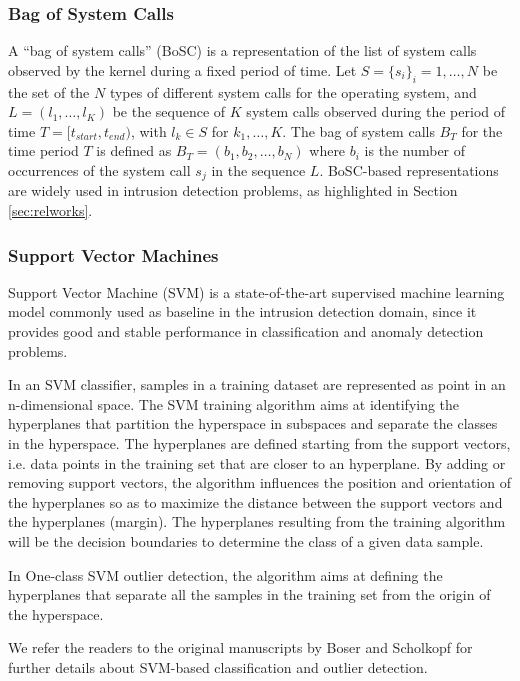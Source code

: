 \subsubsection{Bag of System Calls}
A ``bag of system calls'' (BoSC) is a representation of the list of system calls observed by the kernel during a fixed period of time. Let  $S=\{s_i\}_i=1,\dots,N$ be the set of the $N$ types of different system calls for the operating system, and $L=(l_1,\dots,l_{K})$ be the sequence of $K$ system calls observed during the period of time $T=[t_{start},t_{end})$, with $l_k\in S$ for $k_1,\dots,K$. The bag of system calls $B_T$ for the time period $T$ is defined as $B_T=(b_1,b_2,\dots,b_N)$ where $b_i$ is the number of occurrences of the system call $s_j$ in the sequence $L$. BoSC-based representations are widely used in intrusion detection problems, as highlighted in Section \ref{sec:relworks}.

\subsubsection{Support Vector Machines}
Support Vector Machine (SVM) is a state-of-the-art supervised machine learning model commonly used as baseline in the intrusion detection domain, since it provides good and stable performance in classification and anomaly detection problems.

In an SVM classifier, samples in a training dataset are represented as point in an n-dimensional space. The SVM training algorithm aims at identifying the hyperplanes that partition the hyperspace in subspaces and separate the classes in the hyperspace. The hyperplanes are defined starting from the support vectors, i.e. data points in the training set that are closer to an hyperplane. By adding or removing support vectors, the algorithm influences the position and orientation of the hyperplanes so as to maximize the distance between the support vectors and the hyperplanes (margin). The hyperplanes resulting from the training algorithm will be the decision boundaries to determine the class of a given data sample.

In One-class SVM outlier detection, the algorithm aims at defining the hyperplanes that separate all the samples in the training set from the origin of the hyperspace.

We refer the readers to the original manuscripts by Boser  \cite{boser1992training} and Scholkopf \cite{scholkopf1999support} for further details about SVM-based classification and outlier detection.

